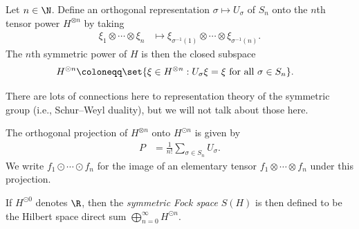 \documentclass[10pt]{mypackage}
\renewcommand{\coloneq}{\coloneqq}
\begin{document}
Let $n\in \N$. Define an orthogonal representation $\sigma\mapsto U_{\sigma}$ of $S_n$ onto the $n$th tensor power $H^{\otimes n}$ by taking
\begin{align*}
  \xi_1\otimes\cdots\otimes \xi_n &\mapsto \xi_{\sigma^{-1}\left( 1 \right)}\otimes\cdots\otimes \xi_{\sigma^{-1}\left( n \right)}.
\end{align*}
The $n$th symmetric power of $H$ is then the closed subspace
\begin{align*}
  H^{\odot n} &\coloneq \set{\xi\in H^{\otimes n} : U_{\sigma}\xi = \xi\text{ for all }\sigma\in S_n}.
\end{align*}
\begin{remark}
There are lots of connections here to representation theory of the symmetric group (i.e., Schur--Weyl duality), but we will not talk about those here.
\end{remark}
The orthogonal projection of $H^{\otimes n}$ onto $H^{\odot n}$ is given by
\begin{align*}
  P &= \frac{1}{n!} \sum_{\sigma\in S_n} U_{\sigma}.
\end{align*}
We write $f_1\odot\cdots\odot f_n$ for the image of an elementary tensor $f_1\otimes\cdots\otimes f_n$ under this projection.

If $H^{\odot 0}$ denotes $\R$, then the \textit{symmetric Fock space} $S\left( H \right)$ is then defined to be the Hilbert space direct sum $\bigoplus_{n=0}^{\infty}H^{\odot n}$.
\end{document}
